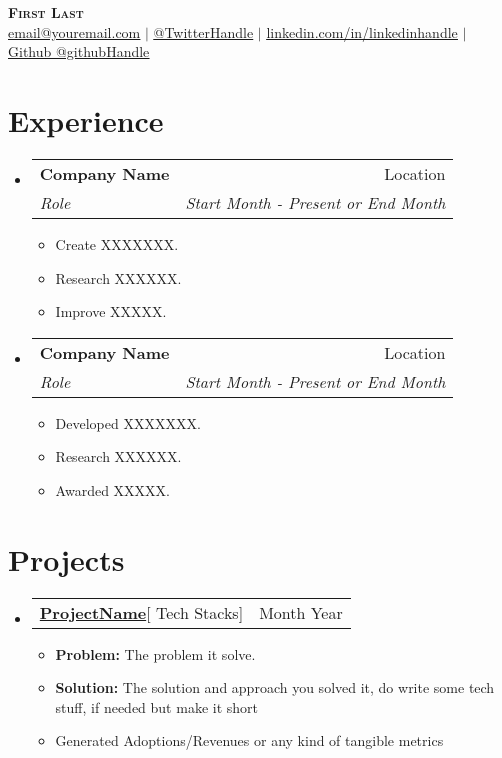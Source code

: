 \documentclass[letterpaper,11pt]{article}
\makeatletter
\newcommand{\resumeItem}[1]{
  \item\small{
    {#1 \vspace{-2pt}}
  }
}
\newcommand{\resumeSubheading}[4]{
  \vspace{-2pt}\item
    \begin{tabular*}{0.97\textwidth}[t]{l@{\extracolsep{\fill}}r}
      \textbf{#1} & #2 \\
      \textit{\small#3} & \textit{\small #4} \\
    \end{tabular*}\vspace{-7pt}
}
\newcommand{\resumeSubSubheading}[2]{
    \item
    \begin{tabular*}{0.97\textwidth}{l@{\extracolsep{\fill}}r}
      \textit{\small#1} & \textit{\small #2} \\
    \end{tabular*}\vspace{-7pt}
}
\newcommand{\resumeProjectHeading}[2]{
    \item
    \begin{tabular*}{0.97\textwidth}{l@{\extracolsep{\fill}}r}
      \small#1 & #2 \\
    \end{tabular*}\vspace{-7pt}
}
\newcommand{\resumeSubHeadingListStart}{\begin{itemize}[leftmargin=0.15in, label={}]}
\newcommand{\resumeSubHeadingListEnd}{\end{itemize}}
\newcommand{\resumeItemListStart}{\begin{itemize}}
\newcommand{\resumeItemListEnd}{\end{itemize}\vspace{-5pt}}
\makeatother
\begin{document}

\begin{center}
    \textbf{\Huge \scshape First Last} \\ \vspace{1pt}
    \href{mailto:youremailaddress}{\underline{email@youremail.com}} $|$ 
    \href{https://twitter.com/twitterhandle}{\underline{@TwitterHandle}} $|$ 
    \href{https://linkedin.com/in/linkedinHandle}{\underline{linkedin.com/in/linkedinhandle}} $|$
    \href{https://github.com/githubhandle}{\underline{Github @githubHandle}}
    
\end{center}


\section{Experience}
  \resumeSubHeadingListStart
    \resumeSubheading
      {Company Name}{Location}
      {Role}{Start Month - Present or End Month}
      \resumeItemListStart
        \resumeItem{Create XXXXXXX. }
        \resumeItem{Research XXXXXX.}
        \resumeItem{Improve XXXXX. }
        
    
      \resumeItemListEnd
    \resumeSubheading
     {Company Name}{Location}
      {Role}{Start Month - Present or End Month}
      \resumeItemListStart
        \resumeItem{Developed XXXXXXX. }
        \resumeItem{Research XXXXXX.}
        \resumeItem{Awarded XXXXX. }
     \resumeItemListEnd


  \resumeSubHeadingListEnd


\section{Projects}
    \resumeSubHeadingListStart
      \resumeProjectHeading
          {\textbf{\href{projectLiveLink}{ProjectName}}{[ Tech Stacks]}}{Month Year}
          \resumeItemListStart
           \resumeItem{\textbf{Problem:} The problem it solve.}
           \resumeItem{\textbf{Solution:} The solution and approach you solved it, do write some tech stuff, if needed but make it short}
           \resumeItem{Generated Adoptions/Revenues or any kind of tangible metrics}
          \resumeItemListEnd
    \resumeSubHeadingListEnd
    
\end{document}
